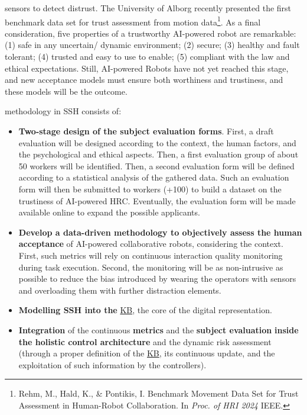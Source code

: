 sensors to detect distrust. The University of Alborg recently presented
the first benchmark data set for trust assessment from motion
data\footnote{Rehm, M., Hald, K., \& Pontikis, I. Benchmark Movement
  Data Set for Trust Assessment in Human-Robot Collaboration. In
  \emph{Proc. of HRI 2024} IEEE.}. As a final consideration, five
properties of a trustworthy AI-powered robot are remarkable: (1) safe in
any uncertain/ dynamic environment; (2) secure; (3) healthy and fault
tolerant; (4) trusted and easy to use to enable; (5) compliant with the
law and ethical expectations. Still, AI-powered Robots have not yet
reached this stage, and new acceptance models must ensure both
worthiness and trustiness, and these models will be the
 outcome.

 methodology in SSH consists of:

\begin{itemize}[compact]
\item
  \textbf{Two-stage design of the subject evaluation forms}. First, a
  draft evaluation will be designed according to the context, the human
  factors, and the psychological and ethical aspects. Then, a first
  evaluation group of about 50 workers will be identified. Then, a
  second evaluation form will be defined according to a statistical
  analysis of the gathered data. Such an evaluation form will then be
  submitted to workers (+100) to build a dataset on the trustiness of
  AI-powered HRC. Eventually, the evaluation form will be made available
  online to expand the possible applicants.
\item
  \textbf{Develop a data-driven methodology to objectively assess the
  human acceptance} of AI-powered collaborative robots, considering the
  context. First, such metrics will rely on continuous interaction
  quality monitoring during task execution. Second, the monitoring will
  be as non-intrusive as possible to reduce the bias introduced by
  wearing the operators with sensors and overloading them with further
  distraction elements.
\item
  \textbf{Modelling SSH into the} \ul{KB}, the core of the
   digital representation.
\item
  \textbf{Integration} of the continuous \textbf{metrics} and the
  \textbf{subject evaluation} \textbf{inside the holistic control
  architecture} and the dynamic risk assessment (through a proper
  definition of the \ul{KB}, its continuous update, and the exploitation
  of such information by the controllers).
\end{itemize}

